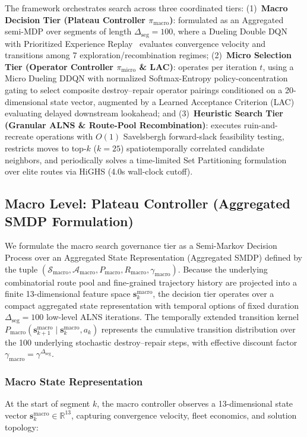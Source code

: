 \documentclass{ieeeaccess}
\begin{document}
The framework orchestrates search across three coordinated tiers: (1)~\textbf{Macro Decision Tier (Plateau Controller $\pi_{\text{macro}}$)}: formulated as an Aggregated semi-MDP over segments of length $\Delta_{\text{seg}} = 100$, where a Dueling Double DQN~\cite{mnih2015human,vanhasselt2016deep} with Prioritized Experience Replay~\cite{schaul2016prioritized} evaluates convergence velocity and transitions among 7 exploration/recombination regimes; (2)~\textbf{Micro Selection Tier (Operator Controller $\pi_{\text{micro}}$ \& LAC)}: operates per iteration $t$, using a Micro Dueling DDQN with normalized Softmax-Entropy policy-concentration gating to select composite destroy--repair operator pairings conditioned on a 20-dimensional state vector, augmented by a Learned Acceptance Criterion (LAC) evaluating delayed downstream lookahead; and (3)~\textbf{Heuristic Search Tier (Granular ALNS \& Route-Pool Recombination)}: executes ruin-and-recreate operations with $O(1)$ Savelsbergh forward-slack feasibility testing, restricts moves to top-$k$ ($k=25$) spatiotemporally correlated candidate neighbors, and periodically solves a time-limited Set Partitioning formulation over elite routes via HiGHS (4.0s wall-clock cutoff).


\subsection{Macro Level: Plateau Controller (Aggregated SMDP Formulation)}
\label{sec:macro_controller}

We formulate the macro search governance tier as a Semi-Markov Decision Process\cite{sutton1999between} over an Aggregated State Representation (Aggregated SMDP) defined by the tuple $(\mathcal{S}_{\text{macro}}, \mathcal{A}_{\text{macro}}, P_{\text{macro}}, R_{\text{macro}}, \gamma_{\text{macro}})$. Because the underlying combinatorial route pool and fine-grained trajectory history are projected into a finite 13-dimensional feature space $\mathbf{s}_k^{\text{macro}}$, the decision tier operates over a compact aggregated state representation with temporal options of fixed duration $\Delta_{\text{seg}} = 100$ low-level ALNS iterations. The temporally extended transition kernel $P_{\text{macro}}(\mathbf{s}_{k+1}^{\text{macro}} \mid \mathbf{s}_k^{\text{macro}}, a_k)$ represents the cumulative transition distribution over the 100 underlying stochastic destroy--repair steps, with effective discount factor $\gamma_{\text{macro}} = \gamma^{\Delta_{\text{seg}}}$.

\subsubsection{Macro State Representation}
At the start of segment $k$, the macro controller observes a 13-dimensional state vector $\mathbf{s}_k^{\text{macro}} \in \mathbb{R}^{13}$, capturing convergence velocity, fleet economics, and solution topology:
\end{document}

